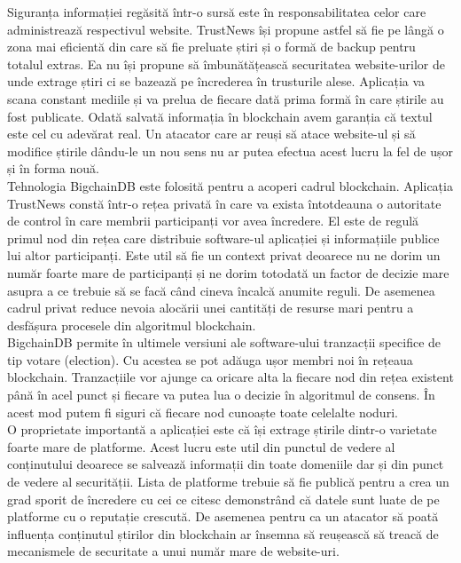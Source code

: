 Siguranța informației regăsită într-o sursă este în responsabilitatea celor care administrează respectivul website. TrustNews își propune astfel să fie pe lângă o zona mai eficientă din care să fie preluate știri și o formă de backup pentru totalul extras. Ea nu își propune să îmbunătățească securitatea website-urilor de unde extrage știri ci se bazează pe încrederea în trusturile alese.
Aplicația va scana constant mediile și va prelua de fiecare dată prima formă în care știrile au fost publicate. Odată salvată informația în blockchain avem garanția că textul este cel cu adevărat real. Un atacator care ar reuși să atace website-ul și să modifice știrile dându-le un nou sens nu ar putea efectua acest lucru la fel de ușor și în forma nouă.\\

Tehnologia BigchainDB este folosită pentru a acoperi cadrul blockchain. Aplicația TrustNews constă într-o rețea privată în care va exista întotdeauna o autoritate de control în care membrii participanți vor avea încredere. El este de regulă primul nod din rețea care distribuie software-ul aplicației și informațiile publice lui altor participanți. Este util să fie un context privat deoarece nu ne dorim un număr foarte mare de participanți și ne dorim totodată un factor de decizie mare asupra a ce trebuie să se facă când cineva încalcă anumite reguli. De asemenea cadrul privat reduce nevoia alocării unei cantități de resurse mari pentru a desfășura procesele din algoritmul blockchain.\\

BigchainDB permite în ultimele versiuni ale software-ului tranzacții specifice de tip votare (election). Cu acestea se pot adăuga ușor membri noi în rețeaua blockchain. Tranzacțiile vor ajunge ca oricare alta la fiecare nod din rețea existent până în acel punct și fiecare va putea lua o decizie în algoritmul de consens. În acest mod putem fi siguri că fiecare nod cunoaște toate celelalte noduri.\\

O proprietate importantă a aplicației este că își extrage știrile dintr-o varietate foarte mare de platforme. Acest lucru este util din punctul de vedere al conținutului deoarece se salvează informații din toate domeniile dar și din punct de vedere al securității. Lista de platforme trebuie să fie publică pentru a crea un grad sporit de încredere cu cei ce citesc demonstrând că datele sunt luate de pe platforme cu o reputație crescută. De asemenea pentru ca un atacator să poată influența conținutul știrilor din blockchain ar însemna să reușească să treacă de mecanismele de securitate a unui număr mare de website-uri.\\

